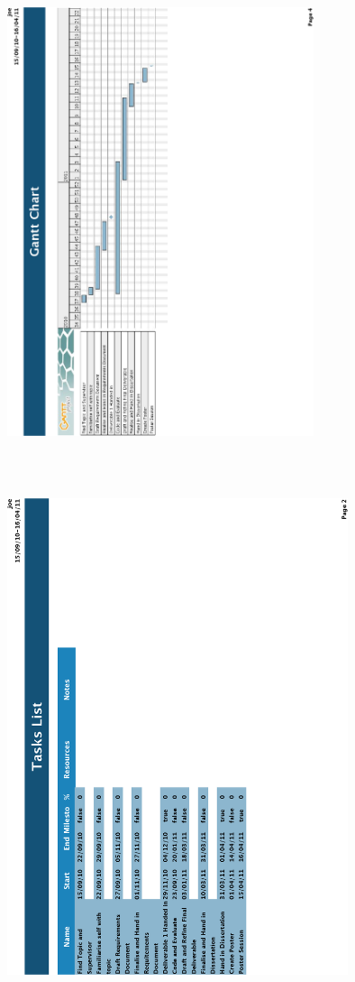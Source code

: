 \documentclass[11pt]{article}
\theoremstyle{definition}
\begin{document}
    \begin{figure}[ht!]
      \centering
      \includegraphics[trim=66 0 160 80,clip, height=16cm, width=9cm, angle=-90]{chart.eps}
      \includegraphics[trim=66 0 100 460,clip, width=10cm, angle=-90]{timetable.eps}
    \end{figure}

  
  
\end{document}
